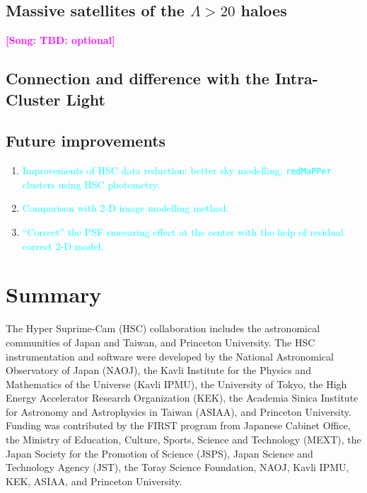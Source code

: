 \documentclass[preprint]{aastex}
\newcommand{\plan}[1]{\textcolor{cyan}{#1}}
\newcommand{\song}[1]{\textcolor{magenta}{\textbf{[Song: #1]}}}
\begin{document}
\begin{CJK*}{UTF8}{gbsn}
\subsection{Massive satellites of the $\Lambda > 20$ haloes}
\song{TBD: optional}

\subsection{Connection and difference with the Intra-Cluster Light}

\subsection{Future improvements}

    \begin{enumerate}
        \item \plan{Improvements of HSC data reduction: better sky modelling; 
            \texttt{redMaPPer} clusters using HSC photometry.}
        \item \plan{Comparison with 2-D image modelling method.}
        \item \plan{``Correct'' the PSF smeearing effect at the center with the help of 
            residual correct 2-D model.}
    \end{enumerate}


\section{Summary}

   


  
\acknowledgements
  
  The Hyper Suprime-Cam (HSC) collaboration includes the astronomical
  communities of Japan and Taiwan, and Princeton University.  The HSC
  instrumentation and software were developed by the National
  Astronomical Observatory of Japan (NAOJ), the Kavli Institute for the
  Physics and Mathematics of the Universe (Kavli IPMU), the University
  of Tokyo, the High Energy Accelerator Research Organization (KEK), the
  Academia Sinica Institute for Astronomy and Astrophysics in Taiwan
  (ASIAA), and Princeton University.  Funding was contributed by the FIRST 
  program from Japanese Cabinet Office, the Ministry of Education, Culture, 
  Sports, Science and Technology (MEXT), the Japan Society for the 
  Promotion of Science (JSPS),  Japan Science and Technology Agency 
  (JST),  the Toray Science  Foundation, NAOJ, Kavli IPMU, KEK, ASIAA,  
  and Princeton University.
   

\end{CJK*}
\end{document}
